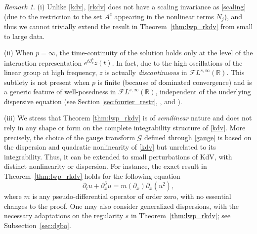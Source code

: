 \documentclass[a4paper,
11pt,  reqno]{amsart}
\newcommand{\red}{\color{red}}
\newcommand{\5}{\textup{V}}
\newcommand{\noi}{\noindent}
\newcommand{\FL}{\mathcal{F} L}
\newcommand{\dx}{\partial_x}
\theoremstyle{remark}
\newtheorem{remark}[theorem]{Remark}
\newcommand{\R}{\mathbb{R}}
\newcommand{\Gc}{\mathcal{G}}
\numberwithin{equation}{section}
\numberwithin{theorem}{section}
\begin{document}
\begin{remark}
\noi(i)
Unlike \eqref{kdv}, \eqref{rkdv} does not have a scaling invariance as \eqref{scaling} (due to the restriction to the set $A^c$ appearing in the nonlinear terms $N_j$), and thus we cannot trivially extend the result in Theorem~\ref{thm:lwp_rkdv} from small to large data.


\smallskip

\label{remark:Linfty_continuity}
\noi (ii) When $p=\infty$, the time-continuity of the solution holds only at the level of the interaction representation $e^{t\dx^3}z(t)$. In fact, due to the high oscillations of the linear group at high frequency, $z$ is actually \emph{discontinuous} in $\FL^{s,\infty}(\R)$. This subtlety is not present when $p$ is finite (because of dominated convergence) and is a generic feature of well-posedness in $\FL^{s,\infty}(\R)$, independent of the underlying dispersive equation (see Section \ref{sec:fourier_restr}, \cite[Section 7]{CC24}, and \cite[Remark~1.4.6]{Forlano}).


\smallskip
{\red 
\noi(iii)
We stress that Theorem \ref{thm:lwp_rkdv} is of \emph{semilinear} nature and does not rely in any shape or form on the complete integrability structure of \eqref{kdv}.
		More precisely, the choice of the gauge transform $\Gc$ defined through \eqref{gauge} is based on the dispersion and quadratic nonlinearity of \eqref{kdv} but unrelated to its integrability. Thus, it can be extended to small perturbations of KdV, with distinct nonlinearity or dispersion. For instance, the exact result in Theorem~\ref{thm:lwp_rkdv} holds for the following equation
		\begin{equation}
			\partial_t u + \partial_x^3 u = m(\partial_x)\partial_x(u^2),
		\end{equation}
		where $m$ is any pseudo-differential operator of order zero,
        with no essential changes to the proof.
 One may also consider generalized dispersions, with the necessary adaptations on the regularity $s$ in Theorem~\ref{thm:lwp_rkdv}; see Subsection~\ref{sec:dgbo}.}


\end{remark}

\bigskip
\end{document}
